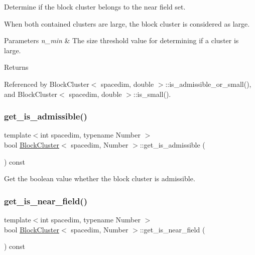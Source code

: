 Determine if the block cluster belongs to the near field set.

When both contained clusters are large, the block cluster is considered as large. 
\begin{DoxyParams}{Parameters}
{\em n\+\_\+min} & The size threshold value for determining if a cluster is large. \\
\hline
\end{DoxyParams}
\begin{DoxyReturn}{Returns}

\end{DoxyReturn}


Referenced by Block\+Cluster$<$ spacedim, double $>$\+::is\+\_\+admissible\+\_\+or\+\_\+small(), and Block\+Cluster$<$ spacedim, double $>$\+::is\+\_\+small().

\mbox{\label{classBlockCluster_a792554d843db2dfb996a1d1086e9178b}} 
\subsubsection{\texorpdfstring{get\+\_\+is\+\_\+admissible()}{get\_is\_admissible()}}
{\footnotesize\ttfamily template$<$int spacedim, typename Number $>$ \\
bool \hyperlink{classBlockCluster}{Block\+Cluster}$<$ spacedim, Number $>$\+::get\+\_\+is\+\_\+admissible (\begin{DoxyParamCaption}{ }\end{DoxyParamCaption}) const}

Get the boolean value whether the block cluster is admissible. \mbox{\label{classBlockCluster_ac263721e28921a6177a025139745fe8d}} 
\subsubsection{\texorpdfstring{get\+\_\+is\+\_\+near\+\_\+field()}{get\_is\_near\_field()}}
{\footnotesize\ttfamily template$<$int spacedim, typename Number $>$ \\
bool \hyperlink{classBlockCluster}{Block\+Cluster}$<$ spacedim, Number $>$\+::get\+\_\+is\+\_\+near\+\_\+field (\begin{DoxyParamCaption}{ }\end{DoxyParamCaption}) const}


